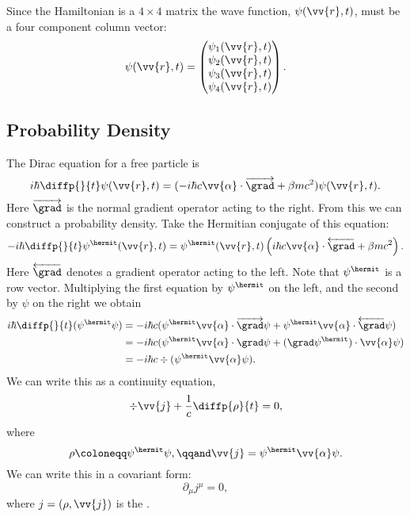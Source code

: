 Since the Hamiltonian is a \(4 \times 4\) matrix the wave function, \(\psi(\vv{r}, t)\), must be a four component column vector:
\begin{equation}
    \psi(\vv{r}, t) = 
    \begin{pmatrix}
        \psi_1(\vv{r}, t)\\ \psi_2(\vv{r}, t)\\ \psi_3(\vv{r}, t)\\ \psi_4(\vv{r}, t)\\
    \end{pmatrix}
    .
\end{equation}

\subsection{Probability Density}
The Dirac equation for a free particle is
\begin{equation}
    i\hbar\diffp{}{t}\psi(\vv{r}, t) = (-i\hbar c\vv{\alpha} \cdot \overrightarrow{\grad} + \beta mc^2)\psi(\vv{r}, t).
\end{equation}
Here \(\overrightarrow{\grad}\) is the normal gradient operator acting to the right.
From this we can construct a probability density.
Take the Hermitian conjugate of this equation:
\begin{equation}
    -i\hbar\diffp{}{t}\psi^\hermit (\vv{r}, t) = \psi^\hermit(\vv{r}, t) \left( i\hbar c\vv{\alpha} \cdot \overleftarrow{\grad} + \beta mc^2 \right).
\end{equation}
Here \(\overleftarrow{\grad}\) denotes a gradient operator acting to the left.
Note that \(\psi^\hermit\) is a row vector.
Multiplying the first equation by \(\psi^\hermit\) on the left, and the second by \(\psi\) on the right we obtain
\begin{align}
    i\hbar\diffp{}{t}(\psi^\hermit \psi) &= -i\hbar c(\psi^\hermit \vv{\alpha} \cdot \overrightarrow{\grad} \psi + \psi^\hermit \vv{\alpha} \cdot \overleftarrow{\grad}\psi)\\
    &= -i\hbar c(\psi^\hermit \vv{\alpha} \cdot \grad \psi + (\grad\psi^\hermit)\cdot \vv{\alpha}\psi)\\
    &= -i\hbar c\div(\psi^\hermit \vv{\alpha} \psi).
\end{align}
We can write this as a continuity equation,
\begin{equation}
    \div\vv{j} + \frac{1}{c}\diffp{\rho}{t} = 0,
\end{equation}
where
\begin{equation}
    \rho \coloneqq \psi^\hermit \psi, \qqand \vv{j} = \psi^{\hermit} \vv{\alpha} \psi.
\end{equation}
We can write this in a covariant form:
\begin{equation}
    \partial_\mu j^\mu = 0,
\end{equation}
where \(j = (\rho, \vv{j})\) is the .


